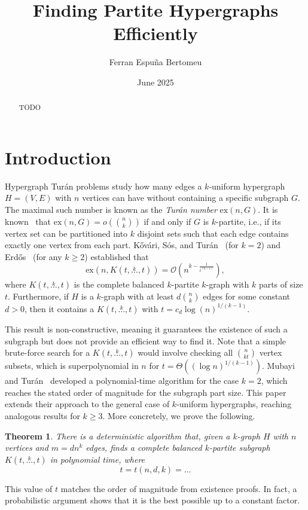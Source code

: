 \documentclass[11pt,a4paper]{article}
\title{Finding Partite Hypergraphs Efficiently}
\author{Ferran Espuña Bertomeu}
\date{June 2025}
\newcommand{\ex}[2]{\ensuremath{\mathrm{ex}(#1, #2)}}
\newcommand{\compoverset}[2]{\ensuremath{K(#2, \overset{#1}{\dots}, #2)}}
\newcommand{\bigO}[1]{\ensuremath{\mathcal{O}\left(#1\right)}}
\newtheorem{theorem}{Theorem}
\theoremstyle{definition}
\begin{document}
\maketitle

\begin{abstract}
TODO %
\end{abstract}

\section{Introduction}\label{sec:introduction}

Hypergraph Turán problems study how many edges a $k$-uniform hypergraph $H = (V, E)$ with $n$ vertices can have without containing a specific subgraph $G$.
The maximal such number is known as the \emph{Turán number} $\ex{n}{G}$.
It is known~\cite{keevash2011hypergraph}
that $\ex{n}{G} = o\left( \binom{n}{k}\right)$ if and only if $G$ is $k$-partite, i.e.,
if its vertex set can be partitioned into $k$ disjoint sets such that each edge contains exactly one vertex from each part.
Kővári, Sós, and Turán~\cite{Kovari1954} (for $k=2$) and
Erdős~\cite{Erods1964} (for any $k \geq 2$) established that
\begin{equation} \label{eq:erdos64-intro}
    \ex{n}{\compoverset{k}{t}} = \bigO{n^{k - \frac{1}{t^{(k-1)}}}},
\end{equation}
where $\compoverset{k}{t}$ is the complete balanced $k$-partite $k$-graph with $k$ parts of size $t$.
Furthermore, if $H$ is a $k$-graph with at least $d \binom{n}{k}$ edges for some constant $d > 0$, then it contains a $\compoverset{k}{t}$ with
$t = c_d \log(n)^{1/(k-1)}$.

This result is non-constructive, meaning it guarantees the existence of such a subgraph but does not provide an efficient way to find it.
Note that a simple brute-force search for a $\compoverset{k}{t}$ would involve checking all $\binom{n}{kt}$ vertex subsets, which is superpolynomial in $n$ for $t = \Theta((\log n)^{1/(k-1)})$.
Mubayi and Turán~\cite{MUBAYI2010174} developed a polynomial-time algorithm for the case $k=2$, which reaches the stated order of magnitude for the subgraph part size.
This paper extends their approach to the general case of $k$-uniform hypergraphs, reaching analogous results for $k \ge 3$.
More concretely, we prove the following.

\begin{theorem} \label{thm:main_theorem}
There is a deterministic algorithm that, given a $k$-graph $H$ with $n$ vertices and $m=dn^k$ edges, finds a complete balanced $k$-partite subgraph $\compoverset{k}{t}$ in polynomial time, where
\[
    t = t(n, d, k) = \dots %
\]
\end{theorem}
This value of $t$ matches the order of magnitude from existence proofs.
In fact, a probabilistic argument shows that it is the best possible up to a constant factor.
\end{document}
